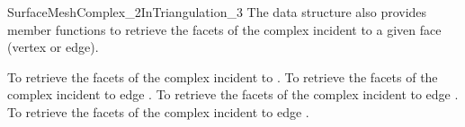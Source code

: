 \begin{ccRefConcept}{SurfaceMeshComplex_2InTriangulation_3}
The data structure also provides  member functions to retrieve
the facets of the complex incident to a given face (vertex or edge).

 {To retrieve the facets of the complex incident to .}
\ccGlue
{}
 {To  retrieve the facets of the complex incident to edge .}
\ccGlue
{}
 {To retrieve the facets of the complex incident to edge .}
\ccGlue
{}
 {To retrieve the facets of the complex incident to edge .}









\end{ccRefConcept}

